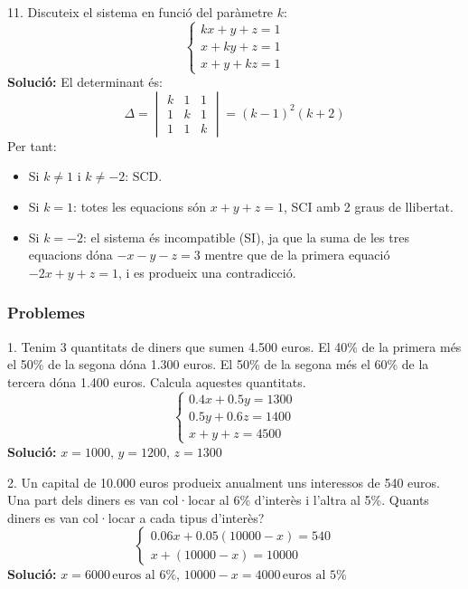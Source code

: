 \documentclass[12pt]{article}
\begin{document}
\begin{exercici}
11. Discuteix el sistema en funció del paràmetre \(k\):
\[
\begin{cases}
kx + y + z = 1 \\
x + ky + z = 1 \\
x + y + kz = 1
\end{cases}
\]
\textbf{Solució:} El determinant és:
\[
\Delta = 
\begin{vmatrix}
k & 1 & 1 \\
1 & k & 1 \\
1 & 1 & k
\end{vmatrix}
= (k-1)^2(k+2)
\]
Per tant:
\begin{itemize}
    \item Si \(k \neq 1\) i \(k \neq -2\): SCD.
    \item Si \(k = 1\): totes les equacions són \(x+y+z=1\), SCI amb 2 graus de llibertat.
    \item Si \(k = -2\): el sistema és incompatible (SI), ja que la suma de les tres equacions dóna \( -x - y - z = 3 \) mentre que de la primera equació \( -2x + y + z = 1 \), i es produeix una contradicció.
\end{itemize}
\end{exercici}

\subsubsection*{Problemes}

\begin{exercici}
1. Tenim 3 quantitats de diners que sumen 4.500 euros. El 40\% de la primera més el 50\% de la segona dóna 1.300 euros. El 50\% de la segona més el 60\% de la tercera dóna 1.400 euros. Calcula aquestes quantitats.
\[
\begin{cases}
0.4x + 0.5y = 1300 \\
0.5y + 0.6z = 1400 \\
x + y + z = 4500
\end{cases}
\]
\textbf{Solució:} \( x = 1000, \, y = 1200, \, z = 1300 \)
\end{exercici}

\begin{exercici}
2. Un capital de 10.000 euros produeix anualment uns interessos de 540 euros. Una part dels diners es van col·locar al 6\% d’interès i l’altra al 5\%. Quants diners es van col·locar a cada tipus d’interès?
\[
\begin{cases}
0.06x + 0.05(10000 - x) = 540 \\
x + (10000 - x) = 10000
\end{cases}
\]
\textbf{Solució:} \( x = 6000 \, \text{euros al 6\%}, \, 10000 - x = 4000 \, \text{euros al 5\%} \)
\end{exercici}
\end{document}

